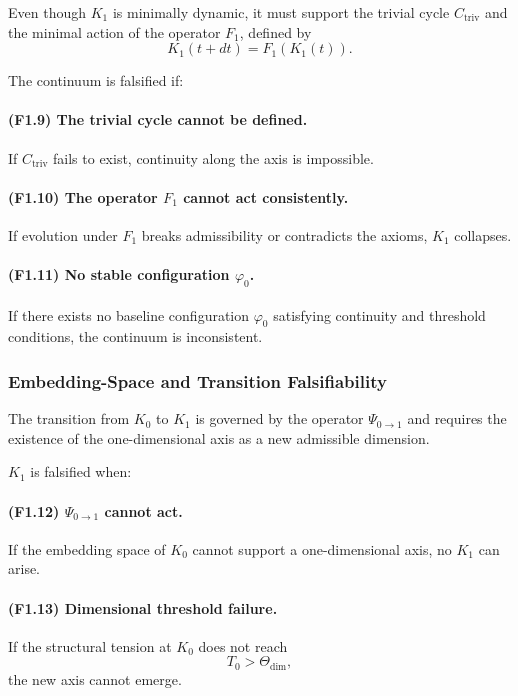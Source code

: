 Even though $K_1$ is minimally dynamic, it must support the trivial cycle
$C_{\mathrm{triv}}$ and the minimal action of the operator $F_1$,
defined by
\[
K_1(t+dt) = F_1(K_1(t)).
\]

The continuum is falsified if:

\paragraph{(F1.9) The trivial cycle cannot be defined.}
If $C_{\mathrm{triv}}$ fails to exist, continuity along the axis is
impossible.

\paragraph{(F1.10) The operator \texorpdfstring{$F_1$}{F_1} cannot act consistently.}
If evolution under $F_1$ breaks admissibility or contradicts the axioms,
$K_1$ collapses.

\paragraph{(F1.11) No stable configuration \texorpdfstring{$\varphi_0$}{\varphi_0}.}
If there exists no baseline configuration $\varphi_0$ satisfying
continuity and threshold conditions, the continuum is inconsistent.



\subsubsection{Embedding-Space and Transition Falsifiability}

The transition from $K_0$ to $K_1$ is governed by the operator
$\Psi_{0\to 1}$ and requires the existence of the one-dimensional axis as
a new admissible dimension.

$K_1$ is falsified when:

\paragraph{(F1.12) $\Psi_{0\to 1}$ cannot act.}
If the embedding space of $K_0$ cannot support a one-dimensional axis,
no $K_1$ can arise.

\paragraph{(F1.13) Dimensional threshold failure.}
If the structural tension at $K_0$ does not reach
\[
T_0 > \Theta_{\mathrm{dim}},
\]
the new axis cannot emerge.


